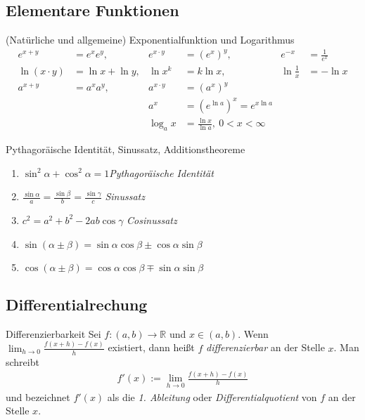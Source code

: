 \subsection{Elementare Funktionen}



\begin{karte}{(Natürliche und allgemeine) Exponentialfunktion und Logarithmus}
	{\large
		\begin{align}
			e^{x+y}         & =  e^{x}e^{y},    & e^{x\cdot y} & ={(e^{x})}^{y}, & e^{-x}           & = \frac{1}{e^{x}} \\
			\ln{(x\cdot y)} & =\ln{x} + \ln{y}, & \ln{x^{k}}   & =k\ln{x},       & \ln{\frac{1}{x}} & = -\ln{x}         \\
			a^{x+y} &=  a^{x}a^{y},				& a^{x\cdot y}&={(a^{x})}^{y}\\
			&&	a^x&={\left(e^{\ln{a}}\right)}^x=e^{x\ln{a}}\\
			&&\log_{a}x&=\frac{\ln{x}}{\ln{a}},\ 0<x<\infty
		\end{align}
	}
\end{karte}

\begin{karte}{Pythagoräische Identität, Sinussatz, Additionstheoreme}
	\begin{enumerate}[label=\(\triangleright \)]
		\item \(\sin^{2}\alpha+\cos^{2}\alpha = 1\)\dotfill \emph{Pythagoräische Identität}
		\item \(\frac{\sin{\alpha}}{a}=\frac{\sin{\beta}}{b}=\frac{\sin{\gamma}}{c} \)  \dotfill \emph{Sinussatz}
		\item \(c^2=a^2+b^2-2ab\cos{\gamma} \)  \dotfill \emph{Cosinussatz}
		\item \(\sin{(\alpha \pm \beta)} 	=	\sin{\alpha}\cos{\beta}	\pm	\cos{\alpha}\sin{\beta}\)
		\item \(\cos{(\alpha \pm \beta)} 	=	\cos{\alpha}\cos{\beta}	\mp	\sin{\alpha}\sin{\beta}\)
	\end{enumerate}
\end{karte}

\subsection{Differentialrechung}

\begin{karte}{Differenzierbarkeit}
	Sei \(f:(a,b)\to\mathbb{R}\) und \(x\in(a,b)\). Wenn \(\displaystyle\lim_{h\to0}\frac{f(x+h)-f(x)}{h}\) existiert, dann heißt \(f\) \emph{differenzierbar} an der Stelle \(x\). Man schreibt
	\begin{align}
		f'(x):=\lim_{h\to0}\frac{f(x+h)-f(x)}{h}
	\end{align}
	und bezeichnet \(f'(x)\) als die \emph{1. Ableitung} oder \emph{Differentialquotient} von \(f\) an der Stelle \(x\).
\end{karte}

